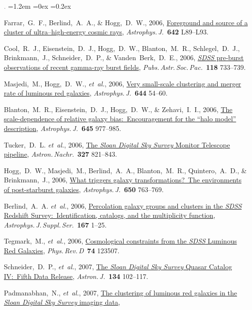 \documentclass[10pt,letterpaper]{article}
\newcommand{\acronym}[1]{{\small{#1}}}
\newcommand{\foreign}[1]{\textsl{#1}}
\newcommand{\etal}{\foreign{et~al.}}
\newcommand{\project}[1]{\textsl{#1}}
\newcommand{\doi}[2]{\href{http://dx.doi.org/#1}{{#2}}}
\newcommand{\deemph}[1]{\textcolor{grey}{\footnotesize{#1}}}
\newcommand{\pubnumber}[1]{\deemph{{#1}.}}
\newcounter{refpubnum}
\newcommand{\hogglist}{%
    \rightmargin=0in
    \leftmargin=1.2em
    \topsep=0ex
    \partopsep=0pt
    \itemsep=0.2ex
    \parsep=0pt
    \itemindent=-1.0\leftmargin
    \listparindent=0.0\leftmargin
    \settowidth{\labelsep}{~}
    \usecounter{refpubnum}
  }
\begin{document}
\begin{list}{\pubnumber{\therefpubnum}}{\hogglist}
\item
Farrar,~G.~F., Berlind,~A.~A., \& Hogg,~D.~W., 2006,
\doi{10.1086/504711}{Foreground and source of a cluster of ultra--high-energy cosmic rays},
\textit{Astrophys.\,J.}\ \textbf{642} L89--L93.
\item
Cool,~R.~J., Eisenstein,~D.~J., Hogg,~D.~W., Blanton,~M.~R., Schlegel,~D.~J., Brinkmann,~J., Schneider,~D.~P., \& Vanden~Berk,~D.~E., 2006,
\doi{10.1086/503334}{\project{\acronym{SDSS}} pre-burst observations of recent gamma-ray burst fields},
\textit{Pubs.\,Astr.\,Soc.\,Pac.}\ \textbf{118} 733--739.
\item\label{pub:Masjedi2006}
Masjedi,~M., Hogg,~D.~W., \etal, 2006,
\doi{10.1086/503536}{Very small-scale clustering and merger rate of luminous red galaxies},
\textit{Astrophys.\,J.}\ \textbf{644} 54--60.
\item
Blanton,~M.~R., Eisenstein,~D.~J., Hogg,~D.~W., \& Zehavi,~I.~I., 2006,
\doi{10.1086/500918}{The scale-dependence of relative galaxy bias:\ Encouragement for the ``halo model'' description},
\textit{Astrophys.\,J.}\ \textbf{645}
977--985.
\item
Tucker,~D.~L. \etal, 2006,
\doi{10.1002/asna.200610655}{The \project{Sloan Digital Sky Survey} Monitor Telescope pipeline},
\textit{Astron.\,Nachr.}\ \textbf{327} 821--843.
\item
Hogg,~D.~W., Masjedi,~M., Berlind,~A.~A., Blanton,~M.~R., Quintero,~A.~D., \& Brinkmann,~J., 2006,
\doi{10.1086/507172}{What triggers galaxy transformations?\ The environments of post-starburst galaxies},
\textit{Astrophys.\,J.}\ \textbf{650} 763--769.
\item
Berlind,~A.~A. \etal, 2006,
\doi{10.1086/508170}{Percolation galaxy groups and clusters in the \project{\acronym{SDSS}} Redshift Survey:\ Identification, catalogs, and the multiplicity function},
\textit{Astrophys.\,J.\,Suppl.\,Ser.}\ \textbf{167} 1--25.
\item
Tegmark,~M., \etal, 2006,
\doi{10.1103/PhysRevD.74.123507}{Cosmological constraints from the \project{\acronym{SDSS}} Luminous Red Galaxies},
\textit{Phys.\,Rev.\,D}\ \textbf{74} 123507.
\item
Schneider,~D.~P., \etal, 2007,
\doi{10.1086/518474}{The \project{Sloan Digital Sky Survey} Quasar Catalog \acronym{IV}:\ Fifth Data Release},
\textit{Astron.\,J.}\ \textbf{134} 102--117.
\item
Padmanabhan,~N., \etal, 2007,
\doi{10.1111/j.1365-2966.2007.11593.x}{The clustering of luminous red galaxies in the \project{Sloan Digital Sky Survey} imaging data},

\end{list}
\end{document}
